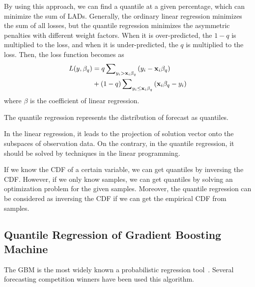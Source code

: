 \documentclass[journal]{IEEEtran} %
\begin{document}
By using this approach, we can find a quantile at a given percentage, which can minimize the sum of LADs. 
Generally, the ordinary linear regression minimizes the sum of all losses, but the quantile regression minimizes the asymmetric penalties with different weight factors. When it is over-predicted, the $1-q$ is multiplied to the loss, and when it is under-predicted, the $q$ is multiplied to the loss. Then, the loss function becomes as
\begin{equation}
\label{QuantileLossFunction}
\begin{aligned}
L(y,{\beta _q}) & = q\sum\nolimits_{{y_i} > {{\bf{x}}_i}{\beta _q}} {({y_i} - {{\bf{x}}_i}{\beta _q})}  \\ & + (1 - q)\sum\nolimits_{{y_i} \le {{\bf{x}}_i}{\beta _q}} {({{\bf{x}}_i}{\beta _q} - {y_i})}
\end{aligned}
\end{equation}
where $\beta$ is the coefficient of linear regression.






The quantile regression represents the distribution of forecast as quantiles.




In the linear regression, it leads to the projection of solution vector onto the subspaces of observation data. On the contrary, in the quantile regression, it should be solved by techniques in the linear programming.





If we know the CDF of a certain variable, we can get quantiles by inversing the CDF. However, if we only know samples, we can get quantiles by solving an optimization problem for the given samples. Moreover, the quantile regression can be considered as inversing the CDF if we can get the empirical CDF from samples.






\subsection{Quantile Regression of Gradient Boosting Machine}
The GBM is the most widely known a probabilistic regression tool~\cite{Friedman}. Several forecasting competition winners have been used this algorithm. 
\end{document}
